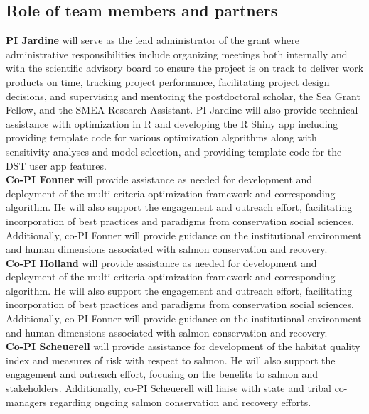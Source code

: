 \documentclass[12pt]{elsarticle}
\begin{document}
\subsection*{Role of team members and partners}
\textbf{PI Jardine} will serve as the lead administrator of the grant where administrative responsibilities include organizing meetings both internally and with the scientific advisory board to ensure the project is on track to deliver work products on time, tracking project performance, facilitating project design decisions, and supervising and mentoring the postdoctoral scholar, the Sea Grant Fellow, and the SMEA Research Assistant.  PI Jardine will also provide technical assistance with optimization in R and developing the R Shiny app including providing template code for various optimization algorithms along with sensitivity analyses and model selection, and providing template code for the DST user app features.\\


\textbf{Co-PI Fonner} will provide assistance as needed for development and deployment of the multi-criteria optimization framework and corresponding algorithm. He will also support the engagement and outreach effort, facilitating incorporation of best practices and paradigms from conservation social sciences. Additionally, co-PI Fonner will provide guidance on the institutional environment and human dimensions associated with salmon conservation and recovery.\\

\textbf{Co-PI Holland} will provide assistance as needed for development and deployment of the multi-criteria optimization framework and corresponding algorithm. He will also support the engagement and outreach effort, facilitating incorporation of best practices and paradigms from conservation social sciences. Additionally, co-PI Fonner will provide guidance on the institutional environment and human dimensions associated with salmon conservation and recovery.\\

\textbf{Co-PI Scheuerell} will provide assistance for development of the habitat quality index and measures of risk with respect to salmon. He will also support the engagement and outreach effort, focusing on the benefits to salmon and stakeholders. Additionally, co-PI Scheuerell will liaise with state and tribal co-managers regarding ongoing salmon conservation and recovery efforts.\\
\end{document}
